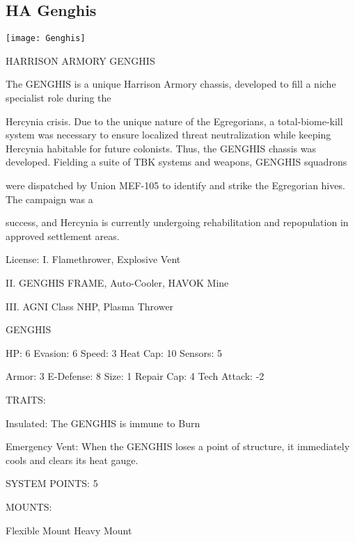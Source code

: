 \subsection{HA Genghis}

\begin{center}
    \texttt{[image: Genghis]}
\end{center}

                                  HARRISON ARMORY GENGHIS

The GENGHIS is a unique Harrison Armory chassis, developed to fill a niche specialist role during the

Hercynia crisis. Due to the unique nature of the Egregorians, a total-biome-kill system was necessary to
ensure localized threat neutralization while keeping Hercynia habitable for future colonists. Thus, the
GENGHIS chassis was developed. Fielding a suite of TBK systems and weapons, GENGHIS squadrons

were dispatched by Union MEF-105 to identify and strike the Egregorian hives. The campaign was a

success, and Hercynia is currently undergoing rehabilitation and repopulation in approved settlement areas.

                                                       License:
I. Flamethrower, Explosive Vent

II. GENGHIS FRAME, Auto-Cooler, HAVOK Mine

III. AGNI Class NHP, Plasma Thrower





                                                GENGHIS

HP: 6          Evasion: 6                            Speed: 3            Heat Cap: 10       Sensors: 5

Armor: 3       E-Defense: 8                          Size: 1             Repair Cap: 4      Tech Attack: -2

                                                  TRAITS:

Insulated: The GENGHIS is immune to Burn

Emergency Vent: When the GENGHIS loses a point of structure, it immediately cools and clears its
heat gauge.

                                            SYSTEM POINTS: 5

                                                 MOUNTS:

Flexible Mount                                        Heavy Mount

